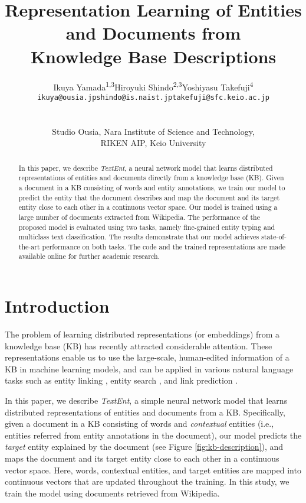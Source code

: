 \documentclass[11pt]{article}
\title{Representation Learning of Entities and Documents from \\ Knowledge Base Descriptions}
\author{
  \begin{tabular}{C{3.3cm} C{3.5cm} C{4.5cm}}
    Ikuya Yamada\textsuperscript{1,3} & Hiroyuki Shindo\textsuperscript{2,3} & Yoshiyasu Takefuji\textsuperscript{4} \\
    {\tt \footnotesize{ikuya@ousia.jp}} & {\tt \footnotesize{shindo@is.naist.jp}} & {\tt \footnotesize{takefuji@sfc.keio.ac.jp}} \\
  \end{tabular}
  \\
  \\
  { Studio Ousia},
  { Nara Institute of Science and Technology},\\
  { RIKEN AIP},
  { Keio University}\\
}
\date{}
\begin{document}
\maketitle
  \begin{abstract}
    In this paper, we describe \textit{TextEnt}, a neural network model that learns distributed representations of entities and documents directly from a knowledge base (KB).
    Given a document in a KB consisting of words and entity annotations, we train our model to predict the entity that the document describes and map the document and its target entity close to each other in a continuous vector space.
    Our model is trained using a large number of documents extracted from Wikipedia.
    The performance of the proposed model is evaluated using two tasks, namely fine-grained entity typing and multiclass text classification.
    The results demonstrate that our model achieves state-of-the-art performance on both tasks.
    The code and the trained representations are made available online for further academic research.
  \end{abstract}

  \section{Introduction}


  The problem of learning distributed representations (or embeddings) from a knowledge base (KB) has recently attracted considerable attention.
  These representations enable us to use the large-scale, human-edited information of a KB in machine learning models, and can be applied in various natural language tasks such as entity linking \cite{hu-EtAl:2015:ACL-IJCNLP,Yamada2016,TACL1065}, entity search \cite{hu-EtAl:2015:ACL-IJCNLP}, and link prediction \cite{Bordes2013,wang-EtAl:2014:EMNLP20145}.

  In this paper, we describe \textit{TextEnt}, a simple neural network model that learns distributed representations of entities and documents from a KB.
  Specifically, given a document in a KB consisting of words and \textit{contextual} entities (i.e., entities referred from entity annotations in the document), our model predicts the \textit{target} entity explained by the document (see Figure \ref{fig:kb-description}), and maps the document and its target entity close to each other in a continuous vector space.
  Here, words, contextual entities, and target entities are mapped into continuous vectors that are updated throughout the training.
  In this study, we train the model using documents retrieved from Wikipedia.
\end{document}
